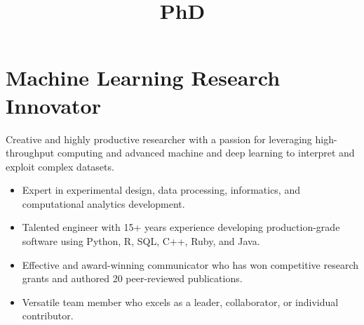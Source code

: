 \documentclass[11pt,letter,sans]{moderncv}
\title{PhD}
\newenvironment{mypar}
    {\setlength{\parskip}{0.5em}}
    {}
\begin{document}
\makecvtitle
    
\section{Machine Learning Research Innovator}


\begin{mypar}
Creative and highly productive researcher with a passion for leveraging high-throughput computing and advanced machine and deep learning to interpret and exploit complex datasets.
\end{mypar}

\begin{itemize}
\item {Expert in experimental design, data processing, informatics, and computational analytics development.}
\item {Talented engineer with 15+ years experience developing production-grade software using Python, R, SQL, C++, Ruby, and Java.}
\item {Effective and award-winning communicator who has won competitive research grants and authored 20 peer-reviewed publications.}
\item {Versatile team member who excels as a leader, collaborator, or individual contributor.}
\end{itemize}
\end{document}
